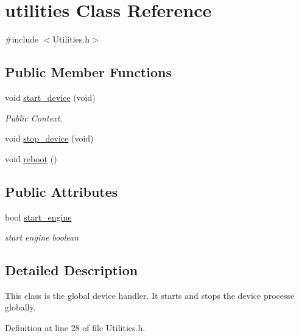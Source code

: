 \hypertarget{classutilities}{\section{utilities \-Class \-Reference}
\label{classutilities}
}


{\ttfamily \#include $<$\-Utilities.\-h$>$}

\subsection*{\-Public \-Member \-Functions}
\begin{DoxyCompactItemize}
\item 
void \hyperlink{classutilities_a6a73417a57d656f15410ad19ea44b439}{start\-\_\-device} (void)
\begin{DoxyCompactList}\small\item\em \-Public \-Context. \end{DoxyCompactList}\item 
void \hyperlink{classutilities_a6c3debc29d468cfc137138a0284104e2}{stop\-\_\-device} (void)
\item 
void \hyperlink{classutilities_a0c34ffbd0eee5f95f331cdabac4b601b}{reboot} ()
\end{DoxyCompactItemize}
\subsection*{\-Public \-Attributes}
\begin{DoxyCompactItemize}
\item 
bool \hyperlink{classutilities_a00ad17c59af67ff895854c2510407513}{start\-\_\-engine}
\begin{DoxyCompactList}\small\item\em start engine boolean \end{DoxyCompactList}\end{DoxyCompactItemize}


\subsection{\-Detailed \-Description}
\-This class is the global device handler. \-It starts and stops the device processe globally. 

\-Definition at line 28 of file \-Utilities.\-h.



